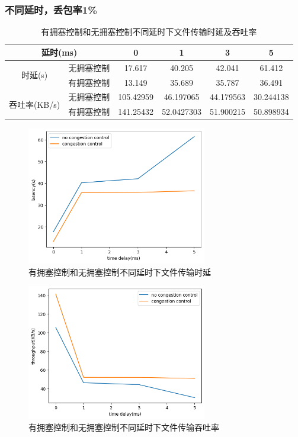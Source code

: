 \documentclass[a4paper]{article}
\begin{document}
\subsubsection{不同延时，丢包率1\%}

\begin{table}[!htbp]
\centering
\begin{tabular}{|cc|c|c|c|c|}
\hline
\multicolumn{2}{|c|}{延时(ms)} & 0 & 1 & 3 & 5 \\ \hline
\multicolumn{1}{|c|}{\multirow{2}{*}{时延(s)}} & 无拥塞控制 & 17.617 & 40.205 & 42.041 & 61.412 \\ \cline{2-6} 
\multicolumn{1}{|c|}{} & 有拥塞控制 & 13.149 & 35.689 & 35.787 & 36.491 \\ \hline
\multicolumn{1}{|c|}{\multirow{2}{*}{吞吐率(KB/s)}} & 无拥塞控制 & 105.42959 & 46.197065 & 44.179563 & 30.244138 \\ \cline{2-6} 
\multicolumn{1}{|c|}{} & 有拥塞控制 & 141.25432 & 52.0427303 & 51.900215 & 50.898934 \\ \hline
\end{tabular}
\caption{有拥塞控制和无拥塞控制不同延时下文件传输时延及吞吐率}
\label{table:5}
\end{table}

\begin{figure}[H]
  \centering
  \includegraphics[width=0.7\textwidth]{f4.jpg}
  \caption{有拥塞控制和无拥塞控制不同延时下文件传输时延}
  \label{fig:5}
\end{figure}

\begin{figure}[H]
  \centering
  \includegraphics[width=0.7\textwidth]{f5.jpg}
  \caption{有拥塞控制和无拥塞控制不同延时下文件传输吞吐率}
  \label{fig:6}
\end{figure}
\end{document}
